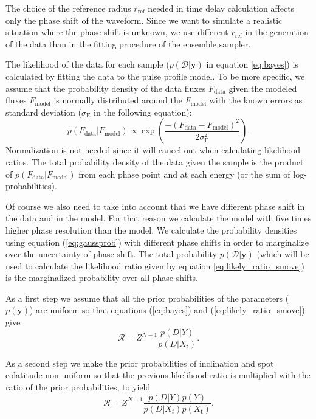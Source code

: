 \documentclass{wihuri}
\def\be{\begin{equation}}
\def\ee{\end{equation}}
\def\tstep{\mathsf{t}}
\def\lratio{\mathcal{R}}
\begin{document}
The choice of the reference radius $r_{\mathrm{ref}}$ needed in time delay calculation affects only the phase shift of the waveform. Since we want to simulate a realistic situation where the phase shift is unknown, we use different $r_{\mathrm{ref}}$ in the generation of the data than in the fitting procedure of the ensemble sampler.  

The likelihood of the data for each sample ($p(\mathcal{D}|\textbf{y})$ in equation \ref{eq:bayes}) is calculated by fitting the data to the pulse profile model. To be more specific, we assume that the probability density of the data fluxes $F_{\mathrm{data}}$ given the modeled fluxes $F_{\mathrm{model}}$  is normally distributed around the $F_{\mathrm{model}}$ with the known errors as standard deviation ($\sigma_{\mathrm{E}}$ in the following equation): 
\be \label{eq:gaussprob}
p(F_{\mathrm{data}}|F_{\mathrm{model}}) \propto \exp \left (\frac{-(F_{\mathrm{data}}-F_{\mathrm{model}})^{2}}{2\sigma_{\mathrm{E}}^{2}} \right ).
\ee
Normalization is not needed since it will cancel out when calculating likelihood ratios. The total probability density of the data given the sample is the product of $p(F_{\mathrm{data}}|F_{\mathrm{model}})$ from each phase point and at each energy (or the sum of log-probabilities). 

Of course we also need to take into account that we have different phase shift in the data and in the model. For that reason we calculate the model with five times higher phase resolution than the model. We calculate the probability densities using equation (\ref{eq:gaussprob}) with different phase shifts in order to marginalize over the uncertainty of phase shift. %
The total probability $p(\mathcal{D}|\textbf{y})$ (which will be used to calculate the likelihood ratio given by equation \ref{eq:likely_ratio_smove}) is the marginalized probability over all phase shifts. 

As a first step we assume that all the prior probabilities of the parameters ($p(\textbf{y})$) are uniform so that equations (\ref{eq:bayes}) and (\ref{eq:likely_ratio_smove}) give 
\be \label{eq:alpha1}
\lratio = Z^{N-1}\frac{p(D|Y)}{p(D|X_{\tstep})}.
\ee

As a second step we make the prior probabilities of inclination and spot colatitude non-uniform so that the previous likelihood ratio is multiplied with the ratio of the prior probabilities, to yield
\be \label{eq:alpha2}
\lratio = Z^{N-1}\frac{p(D|Y)p(Y)}{p(D|X_{t})p(X_{\tstep})}.
\ee
\end{document}
